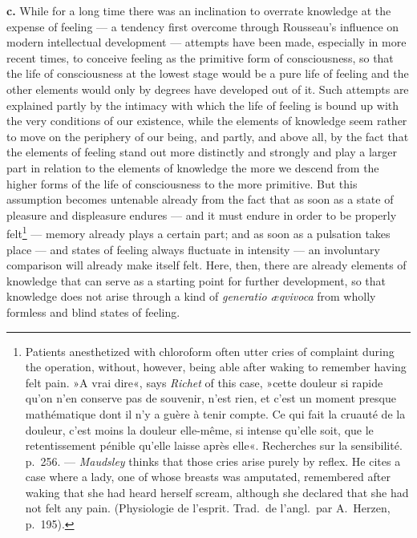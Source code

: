 \documentclass[12pt,a4paper]{book}
\newcommand{\opage}[1]{\marginnote{\footnotesize\textit{[#1]}}}
\begin{document}
\textbf{c.} While for a long time there was an inclination to overrate
knowledge at the expense of feeling --- a tendency first overcome through
Rousseau's influence on modern intellectual development --- attempts
have been made, especially in more recent times, to conceive feeling as
the primitive form of consciousness, so that the life of consciousness at
the lowest stage would be a pure life of feeling and the other elements
would only by degrees have developed out of it. Such attempts are
explained partly by the intimacy with which the life of feeling is bound
up with the very conditions of our existence, while the elements of
knowledge seem rather to move on the periphery of our being, and partly,
and above all, by the fact that the elements of feeling stand out more
distinctly and strongly and play a larger part in relation to the
elements of knowledge the more we descend from the higher forms of the
life of consciousness to the more primitive. But this assumption
\opage{114}becomes untenable already from the fact that as soon as a state
of pleasure and displeasure endures --- and it must endure in order to be
properly felt\footnote{Patients anesthetized with chloroform often utter
cries of complaint during the operation, without, however, being able
after waking to remember having felt pain. »A vrai dire«, says
\emph{Richet} of this case, »cette douleur si rapide qu’on n’en conserve
pas de souvenir, n’est rien, et c’est un moment presque mathématique dont
il n’y a guère à tenir compte. Ce qui fait la cruauté de la douleur,
c’est moins la douleur elle-même, si intense qu’elle soit, que le
retentissement pénible qu’elle laisse après elle«. Recherches sur la
sensibilité. p.~256. --- \emph{Maudsley} thinks that those cries arise
purely by reflex. He cites a case where a lady, one of whose breasts was
amputated, remembered after waking that she had heard herself scream,
although she declared that she had not felt any pain. (Physiologie de
l’esprit. Trad.\ de l’angl.\ par A.~Herzen, p.~195).} --- memory already
plays a certain part; and as soon as a pulsation takes place --- and
states of feeling always fluctuate in intensity --- an involuntary
comparison will already make itself felt. Here, then, there are already
elements of knowledge that can serve as a starting point for further
development, so that knowledge does not arise through a kind of
\textit{generatio æqvivoca} from wholly formless and blind states of
feeling.
\end{document}
